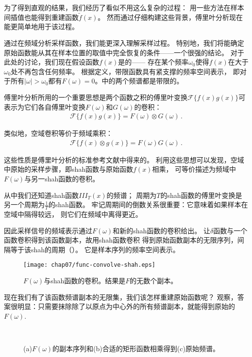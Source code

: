 为了得到直观的结果，我们经历了看似不用这么复杂的过程：
用一些方法在样本间插值也能得到重建函数$\tilde{f}(x)$。
然而通过仔细构建这些背景，傅里叶分析现在能更简单地用于该过程。

通过在频域分析采样函数，我们能更深入理解采样过程。
特别地，我们将能确定原始函数能从其在样本位置的取值中完全恢复的条件——一个很强的结论。
对于此处的讨论，我们现在假设函数$f(x)$是的——
存在某个频率$\omega_0$使得$f(x)$在大于$\omega_0$处不再包含任何频率。
根据定义，带限函数具有紧支撑的频率空间表示，
即对于所有$|\omega|>\omega_0$都有$F(\omega)=0$。中的两个频谱都是带限的。

傅里叶分析所用的一个重要思想是两个函数之积的傅里叶变换$\mathcal{F}\{f(x)g(x)\}$可
表示为它们各自傅里叶变换$F(\omega)$和$G(\omega)$的卷积：
\begin{align*}
    \mathcal{F}\{f(x)g(x)\}=F(\omega)\otimes G(\omega)\, .
\end{align*}

类似地，空域卷积等价于频域乘积：
\begin{align}\label{eq:7.3}
    \mathcal{F}\{f(x)\otimes g(x)\}=F(\omega)G(\omega)\, .
\end{align}

这些性质是傅里叶分析的标准参考文献中得来的。
利用这些思想可以发现，空域中原始的采样步骤，即shah函数与原始函数$f(x)$相乘，
可等价描述为频域中$F(\omega)$与另一shah函数的卷积。

从中我们还知道shah函数$III_T(x)$的频谱；
周期为$T$的shah函数的傅里叶变换是另一个周期为$\displaystyle\frac{1}{T}$的shah函数。
牢记周期间的倒数关系很重要：它意味着如果样本在空域中隔得较远，
则它们在频域中离得更近。

因此采样信号的频域表示通过$F(\omega)$和新的shah函数的卷积给出。
让$\delta$函数与一个函数卷积得到该函数副本，故用shah函数卷积
得到原始函数副本的无限序列，间隔等于该shah的周期（）。
它是样本序列的频率空间表示。
\begin{figure}[htbp]
    \centering\texttt{[image: chap07/func-convolve-shah.eps]}
    \caption{$F(\omega)$与shah函数的卷积。结果是$F$的无数个副本。}
    \label{fig:7.6}
\end{figure}

现在我们有了该函数频谱副本的无限集，我们该怎样重建原始函数呢？
观察，答案很明显：只需要抹除除了以原点为中心外的所有频谱副本，就能得到原始的$F(\omega)$.
\begin{figure}[htbp]
    \centering
    \,
    \,
    \caption{(a)$F(\omega)$的副本序列和(b)合适的矩形函数相乘得到(c)原始频谱。}
    \label{fig:7.7}
\end{figure}

